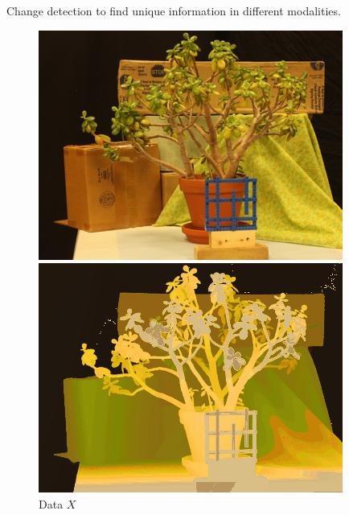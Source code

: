 \documentclass{beamer}
\begin{document}

\begin{frame}
  Change detection to find unique information in different modalities.
  \begin{figure}[ht]
    \centering
    \begin{minipage}[b]{0.32\linewidth}
      \centering
      \includegraphics[width=\textwidth]{./Images/ChangeDetect/JadePlant/pictureX.png}
      \caption{Data $X$}
    \end{minipage}
    \hfill
    \begin{minipage}[b]{0.32\linewidth}
      \centering
      \includegraphics[width=\textwidth]{./Images/ChangeDetect/JadePlant/permX.png}

\end{minipage}
\end{figure}
\end{frame}
\end{document}

